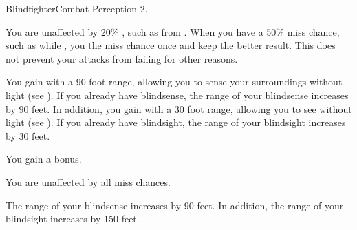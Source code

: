   \begin{feat}{Blindfighter}{Combat}
    \featpre Perception 2.

     You are unaffected by 20\% , such as from .
    When you have a 50\% miss chance, such as while \blinded, you  the miss chance once and keep the better result.
    This does not prevent your attacks from failing for other reasons.

     You gain  with a 90 foot range, allowing you to sense your surroundings without light (see ).
    If you already have blindsense, the range of your blindsense increases by 90 feet.
    In addition, you gain  with a 30 foot range, allowing you to see without light (see ).
    If you already have blindsight, the range of your blindsight increases by 30 feet.

     You gain a   bonus.

     You are unaffected by all miss chances.

     The range of your blindsense increases by 90 feet.
    In addition, the range of your blindsight increases by 150 feet.
  \end{feat}

